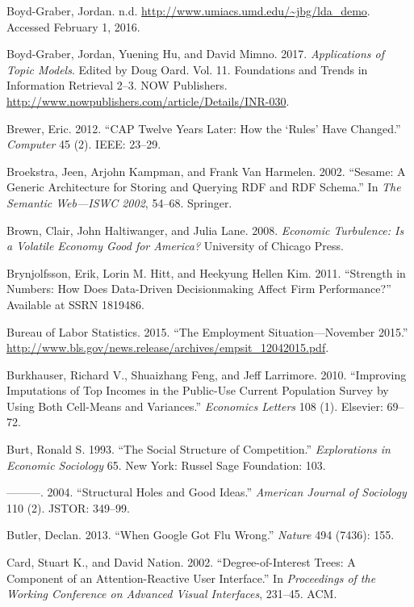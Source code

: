 \documentclass[]{krantz}
\begin{document}
\hypertarget{ref-NSFsearch}{}
Boyd-Graber, Jordan. n.d. \url{http://www.umiacs.umd.edu/~jbg/lda_demo}.
Accessed February 1, 2016.

\hypertarget{ref-boyd-graber-17}{}
Boyd-Graber, Jordan, Yuening Hu, and David Mimno. 2017.
\emph{Applications of Topic Models}. Edited by Doug Oard. Vol. 11.
Foundations and Trends in Information Retrieval 2--3. NOW Publishers.
\url{http://www.nowpublishers.com/article/Details/INR-030}.

\hypertarget{ref-brewer2012cap}{}
Brewer, Eric. 2012. ``CAP Twelve Years Later: How the `Rules' Have
Changed.'' \emph{Computer} 45 (2). IEEE: 23--29.

\hypertarget{ref-broekstra2002sesame}{}
Broekstra, Jeen, Arjohn Kampman, and Frank Van Harmelen. 2002. ``Sesame:
A Generic Architecture for Storing and Querying RDF and RDF Schema.'' In
\emph{The Semantic Web---ISWC 2002}, 54--68. Springer.

\hypertarget{ref-brown2008economic}{}
Brown, Clair, John Haltiwanger, and Julia Lane. 2008. \emph{Economic
Turbulence: Is a Volatile Economy Good for America?} University of
Chicago Press.

\hypertarget{ref-brynjolfsson2011strength}{}
Brynjolfsson, Erik, Lorin M. Hitt, and Heekyung Hellen Kim. 2011.
``Strength in Numbers: How Does Data-Driven Decisionmaking Affect Firm
Performance?'' Available at SSRN 1819486.

\hypertarget{ref-BLS2015}{}
Bureau of Labor Statistics. 2015. ``The Employment Situation---November
2015.''
\url{http://www.bls.gov/news.release/archives/empsit_12042015.pdf}.

\hypertarget{ref-burkhauser2010improving}{}
Burkhauser, Richard V., Shuaizhang Feng, and Jeff Larrimore. 2010.
``Improving Imputations of Top Incomes in the Public-Use Current
Population Survey by Using Both Cell-Means and Variances.''
\emph{Economics Letters} 108 (1). Elsevier: 69--72.

\hypertarget{ref-burt1993social}{}
Burt, Ronald S. 1993. ``The Social Structure of Competition.''
\emph{Explorations in Economic Sociology} 65. New York: Russel Sage
Foundation: 103.

\hypertarget{ref-burt2004structural}{}
---------. 2004. ``Structural Holes and Good Ideas.'' \emph{American
Journal of Sociology} 110 (2). JSTOR: 349--99.

\hypertarget{ref-butler2013google}{}
Butler, Declan. 2013. ``When Google Got Flu Wrong.'' \emph{Nature} 494
(7436): 155.

\hypertarget{ref-card2002degree}{}
Card, Stuart K., and David Nation. 2002. ``Degree-of-Interest Trees: A
Component of an Attention-Reactive User Interface.'' In
\emph{Proceedings of the Working Conference on Advanced Visual
Interfaces}, 231--45. ACM.
\end{document}
